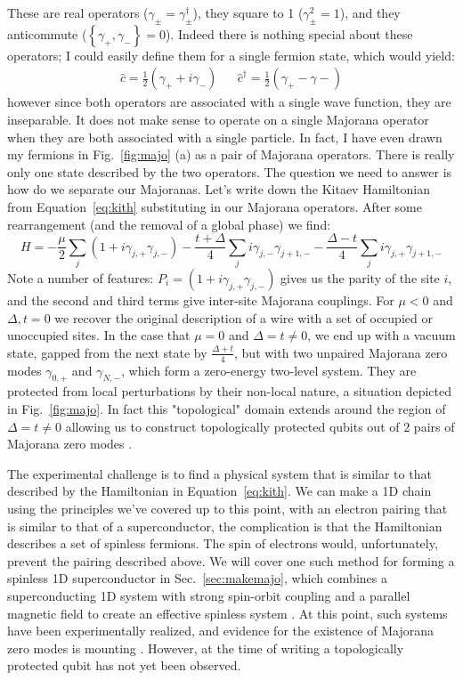 These are real operators ($\gamma_\pm = \gamma_\pm^\dagger$), they square to 1 ($\gamma_\pm^2 = 1$), and they anticommute ($\left\{\gamma_+, \gamma_-\right\} = 0$).
Indeed there is nothing special about these operators; I could easily define them for a single fermion state, which would yield:
\begin{align}
  \hat c = \frac{1}{2}(\gamma_{+} + i\gamma_{-}) && \hat c^\dagger = \frac{1}{2}(\gamma_{+} - \gamma{-})
\end{align}
however since both operators are associated with a single wave function, they are inseparable. It does not make sense to operate on a single Majorana
operator when they are both associated with a single particle. In fact, I have even drawn my fermions in Fig.~\ref{fig:majo} (a) as a
pair of Majorana operators. There is really only one state described by the two operators.
The question we need to answer is how do we separate our Majoranas. Let's write down the Kitaev Hamiltonian from Equation~\ref{eq:kith}
substituting in our Majorana operators. After some rearrangement (and the removal of a global phase) we find:
\begin{equation}
  H = -\frac{\mu}{2}\sum_j(1 + i\gamma_{j,+}\gamma_{j,-}) - \frac{t + \Delta}{4}\sum_j i \gamma_{j,-}\gamma_{j+1,-} - \frac{\Delta - t}{4}\sum_j i \gamma_{j,+}\gamma_{j+1,-}
\end{equation}
Note a number of features: $P_i = (1 + i\gamma_{j,+}\gamma_{j,-})$ gives us the parity of the site $i$, and the second and third terms give inter-site Majorana couplings.
For $\mu < 0$ and $\Delta, t = 0$ we recover the original description of a wire with a set of occupied or unoccupied sites. In the case
that $\mu = 0$ and $\Delta = t \neq 0$, we end up with a vacuum state, gapped from the next state by $\tfrac{\Delta+t}{4}$, but with two unpaired
Majorana zero modes $\gamma_{0,+}$ and $\gamma_{N,-}$, which form a zero-energy two-level system. They are protected from local perturbations
by their non-local nature, a situation depicted in Fig.~\ref{fig:majo}. In fact this "topological" domain extends around the region of $\Delta = t \neq 0$
allowing us to construct topologically protected qubits out of 2 pairs of Majorana zero modes \cite{RevModPhys.80.1083}.

The experimental challenge is to find a physical system that is similar to that described by the Hamiltonian in Equation~\ref{eq:kith}. We can make a 1D chain using the principles
we've covered up to this point, with an electron pairing that is similar to that of a superconductor, the complication is that the Hamiltonian describes
a set of spinless fermions. The spin of electrons would, unfortunately, prevent the pairing described above. We will cover one such method for forming
a spinless 1D superconductor in Sec.~\ref{sec:makemajo}, which combines a superconducting 1D system with strong spin-orbit coupling and a
parallel magnetic field to create an effective spinless system \cite{PhysRevLett.105.077001,PhysRevLett.105.177002}. At this point, such systems
have been experimentally realized, and evidence for the existence of Majorana zero modes is mounting \cite{Mourik1003,s41578-018-0003-1}. However, at the time of writing
a topologically protected qubit has not yet been observed.

